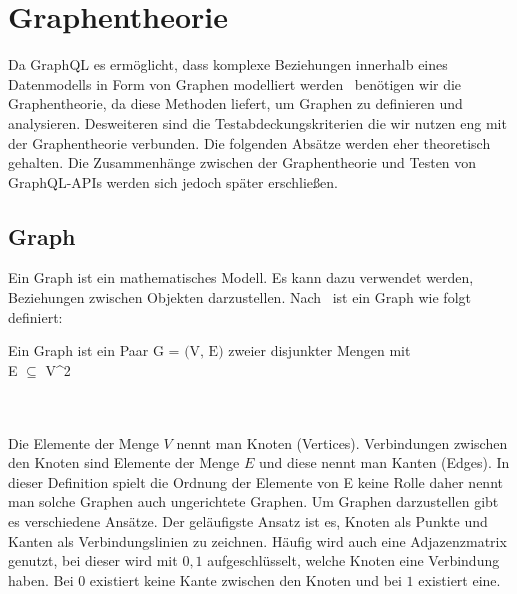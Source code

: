 \section{Graphentheorie}
\label{sec:graphentheorie}

Da GraphQL es ermöglicht, dass komplexe Beziehungen innerhalb eines Datenmodells in Form von Graphen modelliert werden~\cite[vgl. Modelling with Graph(QL)]{graphqlgraphtheory}
benötigen wir die Graphentheorie, da diese Methoden liefert, um Graphen zu definieren und analysieren.
Desweiteren sind die Testabdeckungskriterien die wir nutzen eng mit der Graphentheorie verbunden.
Die folgenden Absätze werden eher theoretisch gehalten.
Die Zusammenhänge zwischen der Graphentheorie und Testen von GraphQL-APIs werden sich jedoch später erschließen.

\subsection{Graph}

Ein Graph ist ein mathematisches Modell.
Es kann dazu verwendet werden, Beziehungen zwischen Objekten darzustellen.
Nach~\cite{graphentheorie} ist ein Graph wie folgt definiert:

\begin{definition}
    Ein Graph ist ein Paar $\textrm{G = (V, E)}$ zweier disjunkter Mengen mit \\ E $\subseteq$ V^2
    \label{graphdef}
\end{definition}\cite[vgl. S.2 0.1 Graphen]{graphentheorie}
\\
\\
Die Elemente der Menge $V$ nennt man Knoten (Vertices).
Verbindungen zwischen den Knoten sind Elemente der Menge $E$ und diese nennt man Kanten (Edges).
In dieser Definition spielt die Ordnung der Elemente von E keine Rolle daher nennt man solche Graphen auch ungerichtete Graphen.
Um Graphen darzustellen gibt es verschiedene Ansätze.
Der geläufigste Ansatz ist es, Knoten als Punkte und Kanten als Verbindungslinien zu zeichnen.
Häufig wird auch eine Adjazenzmatrix genutzt, bei dieser wird mit $0,1$ aufgeschlüsselt, welche Knoten eine Verbindung haben.
Bei $0$ existiert keine Kante zwischen den Knoten und bei $1$ existiert eine.

